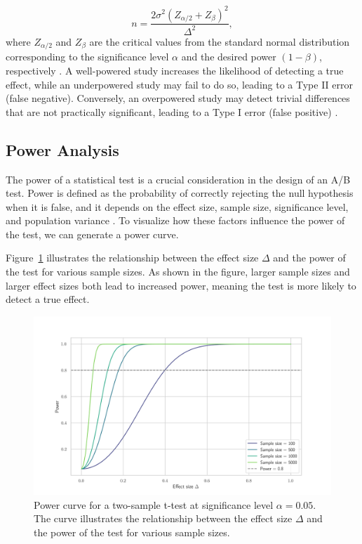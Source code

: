 \documentclass[magisterska, english]{pwr_wmat_praca_dyplomowa}
\theoremstyle{plain}
\numberwithin{theorem}{chapter}
\theoremstyle{definition}
\numberwithin{theorem}{chapter}
\begin{document}
\[
n = \frac{2\sigma^2(Z_{\alpha/2} + Z_\beta)^2}{\Delta^2},
\]
where $Z_{\alpha/2}$ and $Z_\beta$ are the critical values from the standard normal distribution corresponding to the significance level $\alpha$ and the desired power $(1-\beta)$, respectively \cite{Cohen1988}. A well-powered study increases the likelihood of detecting a true effect, while an underpowered study may fail to do so, leading to a Type II error (false negative). Conversely, an overpowered study may detect trivial differences that are not practically significant, leading to a Type I error (false positive) \cite{Sullivan2012}.

\subsection{Power Analysis}

The power of a statistical test is a crucial consideration in the design of an A/B test. Power is defined as the probability of correctly rejecting the null hypothesis when it is false, and it depends on the effect size, sample size, significance level, and population variance \cite{Cohen1988}. To visualize how these factors influence the power of the test, we can generate a power curve.

Figure~\ref{fig:power_curve} illustrates the relationship between the effect size $\Delta$ and the power of the test for various sample sizes. As shown in the figure, larger sample sizes and larger effect sizes both lead to increased power, meaning the test is more likely to detect a true effect.

\begin{figure}[H]
	\centering
	\includegraphics[width=\textwidth]{imagens/power_curve.png}
	\caption{Power curve for a two-sample t-test at significance level $\alpha = 0.05$. The curve illustrates the relationship between the effect size $\Delta$ and the power of the test for various sample sizes.}
	\label{fig:power_curve}
\end{figure}
\end{document}
